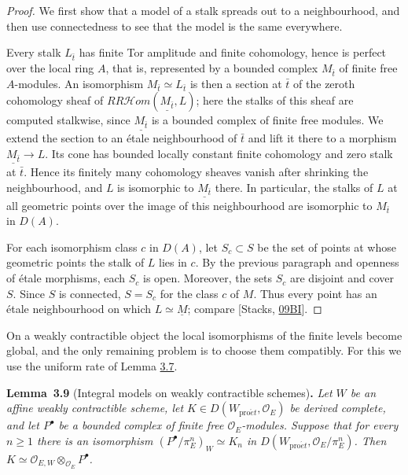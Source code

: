 \documentclass[11pt]{article}
\newenvironment{bpstatement}[2]{\par\addvspace{0.6\baselineskip}\noindent\textbf{#1}#2\textbf{.}\enspace\ignorespaces}
  {\par\addvspace{0.4\baselineskip}}
\newenvironment{bpstatementit}[2]{\begin{bpstatement}{#1}{#2}\itshape\ignorespaces}{\end{bpstatement}}
\providecommand{\cHom}{}\renewcommand{\cHom}{R\mathcal{H}\!om}
\begin{document}
\begin{proof}[{Proof}]\label{bp27}%
We first show that a model of a stalk spreads out to a neighbourhood, and then use connectedness to see that the model is the same everywhere.

Every stalk \(L_{\bar t}\) has finite Tor amplitude and finite cohomology, hence is perfect over the local ring \(A\), that is, represented by a bounded complex \(M_{\bar t}\) of finite free \(A\)-modules. An isomorphism \(M_{\bar t}\simeq L_{\bar t}\) is then a section at \(\bar t\) of the zeroth cohomology sheaf of \(R\cHom(\underline{M_{\bar t}},L)\); here the stalks of this sheaf are computed stalkwise, since \(\underline{M_{\bar t}}\) is a bounded complex of finite free modules. We extend the section to an étale neighbourhood of \(\bar t\) and lift it there to a morphism \(\underline{M_{\bar t}}\to L\). Its cone has bounded locally constant finite cohomology and zero stalk at \(\bar t\). Hence its finitely many cohomology sheaves vanish after shrinking the neighbourhood, and \(L\) is isomorphic to \(\underline{M_{\bar t}}\) there. In particular, the stalks of \(L\) at all geometric points over the image of this neighbourhood are isomorphic to \(M_{\bar t}\) in \(D(A)\).

For each isomorphism class \(c\) in \(D(A)\), let \(S_c\subset S\) be the set of points at whose geometric points the stalk of \(L\) lies in \(c\). By the previous paragraph and openness of étale morphisms, each \(S_c\) is open. Moreover, the sets \(S_c\) are disjoint and cover \(S\). Since \(S\) is connected, \(S=S_c\) for the class \(c\) of \(M\). Thus every point has an étale neighbourhood on which \(L\simeq\underline M\); compare [Stacks, \href{https://stacks.math.columbia.edu/tag/09BI}{09BI}].
\end{proof}

\label{bp28}%
On a weakly contractible object the local isomorphisms of the finite levels become global, and the only remaining problem is to choose them compatibly. For this we use the uniform rate of Lemma \hyperref[bp22]{3.7}.

\label{bp29}%
\begin{bpstatementit}{Lemma~3.9}{ (Integral models on weakly contractible schemes)}
Let \(W\) be an affine weakly contractible scheme, let \(K\in D(W_{\mathrm{pro}\acute{e}t},\mathcal O_E)\) be derived complete, and let \(P^\bullet\) be a bounded complex of finite free \(\mathcal O_E\)-modules. Suppose that for every \(n\geq1\) there is an isomorphism \((P^\bullet/\pi_E^n)_W\simeq K_n\) in \(D(W_{\mathrm{pro}\acute{e}t},\mathcal O_E/\pi_E^n)\). Then \(K\simeq\mathcal O_{E,W}\otimes_{\mathcal O_E}P^\bullet\).
\end{bpstatementit}
\end{document}
